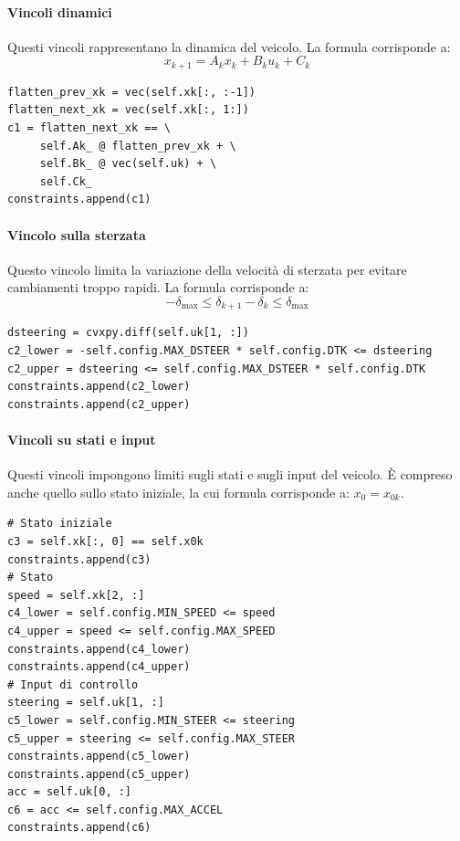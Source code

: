 \paragraph{Vincoli dinamici} Questi vincoli rappresentano la dinamica del veicolo. La formula corrisponde a: 
\[
x_{k+1} = A_k x_k + B_k u_k + C_k 
\]
\begin{lstlisting}[language=PythonPlus]
flatten_prev_xk = vec(self.xk[:, :-1])
flatten_next_xk = vec(self.xk[:, 1:])
c1 = flatten_next_xk == \
     self.Ak_ @ flatten_prev_xk + \
     self.Bk_ @ vec(self.uk) + \
     self.Ck_
constraints.append(c1)
\end{lstlisting}
\paragraph{Vincolo sulla sterzata} Questo vincolo limita la variazione della velocità di sterzata 
per evitare cambiamenti troppo rapidi. La formula corrisponde a:
\[
-\delta_\text{max} \leq \delta_{k+1} - \delta_k \leq \delta_\text{max}
\]
\begin{lstlisting}[language=PythonPlus]
dsteering = cvxpy.diff(self.uk[1, :])
c2_lower = -self.config.MAX_DSTEER * self.config.DTK <= dsteering
c2_upper = dsteering <= self.config.MAX_DSTEER * self.config.DTK
constraints.append(c2_lower)
constraints.append(c2_upper)
\end{lstlisting}
\paragraph{Vincoli su stati e input} Questi vincoli impongono limiti sugli stati e sugli input
del veicolo. È compreso anche quello sullo stato iniziale, la cui formula corrisponde a: $x_0 = x_{0k}$.
\newpage
\begin{lstlisting}[language=PythonPlus]
# Stato iniziale
c3 = self.xk[:, 0] == self.x0k
constraints.append(c3)
# Stato
speed = self.xk[2, :]
c4_lower = self.config.MIN_SPEED <= speed
c4_upper = speed <= self.config.MAX_SPEED
constraints.append(c4_lower)
constraints.append(c4_upper)
# Input di controllo
steering = self.uk[1, :]
c5_lower = self.config.MIN_STEER <= steering
c5_upper = steering <= self.config.MAX_STEER
constraints.append(c5_lower)
constraints.append(c5_upper)
acc = self.uk[0, :]
c6 = acc <= self.config.MAX_ACCEL
constraints.append(c6)
\end{lstlisting}

